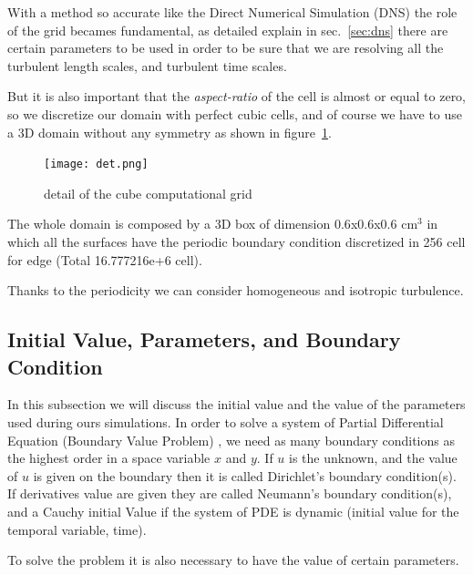 With a method so accurate like the Direct Numerical Simulation (DNS) the role of the grid becames fundamental, as detailed explain in sec.~\ref{sec:dns} there are certain parameters to be used in order to be sure that we are resolving all the turbulent length scales, and turbulent time scales. 

But it is also important that the \textit{aspect-ratio} of the cell is almost or equal to zero, so we discretize our domain with perfect cubic cells, and of course we have to use a 3D domain without any symmetry as shown in figure~\ref{mesh}. 


\begin{figure}[h]
\centering 
\texttt{[image: det.png]}
\caption{detail of the cube computational grid}
\label{mesh}
\end{figure}
The whole domain is composed by a 3D box of dimension $0.6$x$0.6$x$0.6$ cm$^3$ in which all the surfaces have the periodic boundary condition discretized in 256 cell for edge (Total 16.777216e+6 cell).

Thanks to the periodicity we can consider homogeneous and isotropic turbulence. 



\newpage
\subsection{Initial Value, Parameters, and Boundary Condition}

In this subsection we will discuss the initial value and the value of the parameters used during ours simulations. 
In order to solve a system of Partial Differential Equation (Boundary Value Problem) , we need as many boundary conditions as the highest order in a space variable $x$ and $y$. If $u$ is the unknown, and the value of $u$ is given on the boundary then it is called Dirichlet's boundary condition(s).
If derivatives value are given they are called Neumann's boundary condition(s), and a Cauchy initial Value if the system of PDE is dynamic (initial value for the temporal variable, time).

To solve the problem it is also necessary to have the value of certain parameters.

